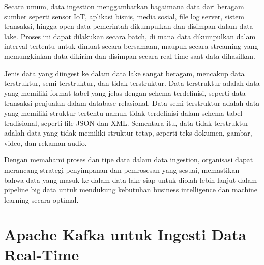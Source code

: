 Secara umum, data ingestion menggambarkan bagaimana data dari beragam sumber seperti sensor IoT, aplikasi bisnis, media sosial, file log server, sistem transaksi, hingga open data pemerintah dikumpulkan dan disimpan dalam data lake. Proses ini dapat dilakukan secara batch, di mana data dikumpulkan dalam interval tertentu untuk dimuat secara bersamaan, maupun secara streaming yang memungkinkan data dikirim dan disimpan secara real-time saat data dihasilkan.

Jenis data yang diingest ke dalam data lake sangat beragam, mencakup data terstruktur, semi-terstruktur, dan tidak terstruktur. Data terstruktur adalah data yang memiliki format tabel yang jelas dengan schema terdefinisi, seperti data transaksi penjualan dalam database relasional. Data semi-terstruktur adalah data yang memiliki struktur tertentu namun tidak terdefinisi dalam schema tabel tradisional, seperti file JSON dan XML. Sementara itu, data tidak terstruktur adalah data yang tidak memiliki struktur tetap, seperti teks dokumen, gambar, video, dan rekaman audio.

Dengan memahami proses dan tipe data dalam data ingestion, organisasi dapat merancang strategi penyimpanan dan pemrosesan yang sesuai, memastikan bahwa data yang masuk ke dalam data lake siap untuk diolah lebih lanjut dalam pipeline big data untuk mendukung kebutuhan business intelligence dan machine learning secara optimal.

\section{Apache Kafka untuk Ingesti Data Real-Time}


